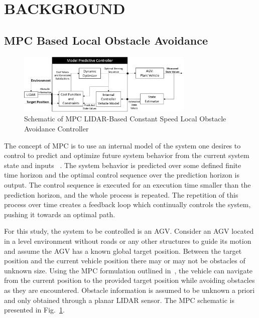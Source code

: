 \documentclass[12pt,twocolumn]{article}
\begin{document}

\section{BACKGROUND}\label{s:background}

\subsection{MPC Based Local Obstacle Avoidance }\label{MPC}

\begin{figure}
	\centering
	\includegraphics[width=0.75\textwidth]{Figs/MPCBlockDiagram.png}
	\caption{{\small Schematic of MPC LIDAR-Based Constant Speed Local Obstacle Avoidance Controller}}    
	\label{fig:MPC_schematic}
\end{figure}

The concept of MPC is to use an internal model of the system one desires to control to predict and optimize future system behavior from the current system state and inputs ~\cite{Allgower&Findeisen2002}. The system behavior is predicted over some defined finite time horizon and the optimal control sequence over the prediction horizon is output. The control sequence is executed for an execution time smaller than the prediction horizon, and the whole process is repeated. The repetition of this process over time creates a feedback loop which continually controls the system, pushing it towards an optimal path.

For this study, the system to be controlled is an AGV. Consider an AGV located in a level environment without roads or any other structures to guide its motion and assume the AGV has a known global target position. Between the target position and the current vehicle position there may or may not be obstacles of unknown size. Using the MPC formulation outlined in~\cite{ModelFidelity2016}, the vehicle can navigate from the current position to the provided target position while avoiding obstacles as they are encountered. Obstacle information is assumed to be unknown a priori and only obtained through a planar LIDAR sensor. The MPC schematic is presented in Fig.~\ref{fig:MPC_schematic}.
%
\end{document}
